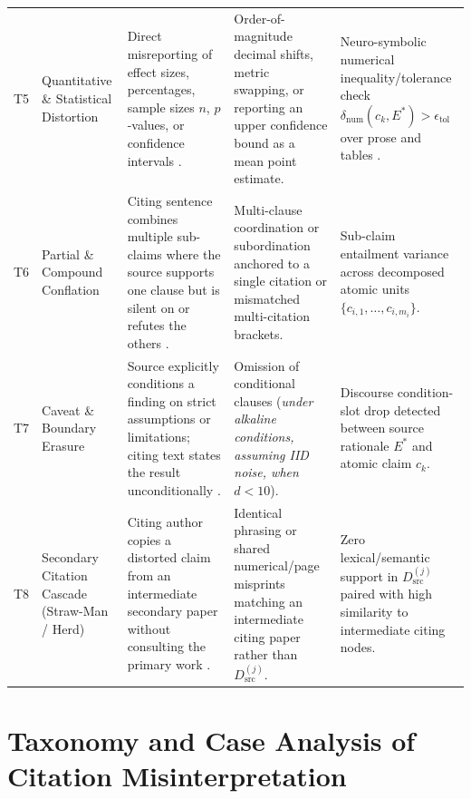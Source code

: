 \documentclass[sigconf]{acmart}
\begin{document}
\begin{table}[t]
\begin{tabularx}{\textwidth}{L{0.5cm} L{3.0cm} L{4.2cm} L{4.2cm} Y}
T5 & Quantitative \& Statistical Distortion & Direct misreporting of effect sizes, percentages, sample sizes $n$, $p$-values, or confidence intervals \cite{harzing2002referencing,rekdal2014urban}. & Order-of-magnitude decimal shifts, metric swapping, or reporting an upper confidence bound as a mean point estimate. & Neuro-symbolic numerical inequality/tolerance check $\delta_{\text{num}}(c_k, E^*) > \epsilon_{\text{tol}}$ over prose and tables \cite{lu2023scitab}. \\
T6 & Partial \& Compound Conflation & Citing sentence combines multiple sub-claims where the source supports one clause but is silent on or refutes the others \cite{kamoi2023wice,min2023factscore}. & Multi-clause coordination or subordination anchored to a single citation or mismatched multi-citation brackets. & Sub-claim entailment variance across decomposed atomic units $\{c_{i,1}, \dots, c_{i,m_i}\}$. \\
T7 & Caveat \& Boundary Erasure & Source explicitly conditions a finding on strict assumptions or limitations; citing text states the result unconditionally \cite{hyland1998hedging,smith2020quotation}. & Omission of conditional clauses (\emph{under alkaline conditions, assuming IID noise, when $d < 10$}). & Discourse condition-slot drop detected between source rationale $E^*$ and atomic claim $c_k$. \\
T8 & Secondary Citation Cascade (Straw-Man / Herd) & Citing author copies a distorted claim from an intermediate secondary paper without consulting the primary work \cite{simkin2003read,rekdal2014sinking}. & Identical phrasing or shared numerical/page misprints matching an intermediate citing paper rather than $D_{\text{src}}^{(j)}$. & Zero lexical/semantic support in $D_{\text{src}}^{(j)}$ paired with high similarity to intermediate citing nodes. \\
\bottomrule
\end{tabularx}
\end{table}

\section{Taxonomy and Case Analysis of Citation Misinterpretation}
\label{sec:taxonomy}
\end{document}
